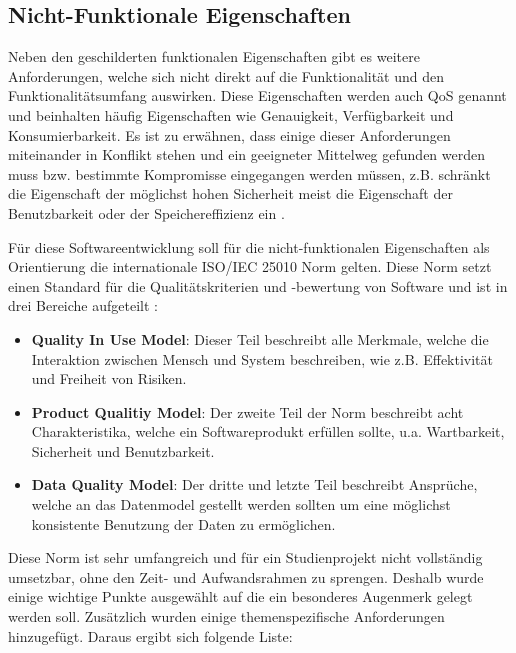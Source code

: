 \subsection{Nicht-Funktionale Eigenschaften}
Neben den geschilderten funktionalen Eigenschaften gibt es weitere Anforderungen, welche sich nicht direkt auf die Funktionalität und den Funktionalitätsumfang auswirken. Diese Eigenschaften werden auch \ac{QoS} genannt und beinhalten häufig Eigenschaften wie  Genauigkeit, Verfügbarkeit und  Konsumierbarkeit. Es ist zu erwähnen, dass einige dieser Anforderungen miteinander in Konflikt stehen und ein geeigneter Mittelweg gefunden werden muss bzw. bestimmte Kompromisse eingegangen werden müssen, z.B. schränkt die Eigenschaft der möglichst hohen Sicherheit meist die Eigenschaft der Benutzbarkeit oder der Speichereffizienz ein \cite{Balzert.2009}.  

\vspace{0.25cm}

Für diese Softwareentwicklung soll für die nicht-funktionalen Eigenschaften als Orientierung die internationale ISO/IEC 25010 Norm gelten. Diese Norm setzt einen Standard für die Qualitätskriterien und -bewertung von Software und ist in drei Bereiche aufgeteilt \cite{ISO.2011} \cite{Braun.2016}:

\begin{itemize}
	\item \textbf{Quality In Use Model}: Dieser Teil beschreibt alle Merkmale, welche die Interaktion zwischen Mensch und System beschreiben, wie z.B. Effektivität und Freiheit von Risiken.
	\item \textbf{Product Qualitiy Model}: Der zweite Teil der Norm beschreibt acht Charakteristika, welche ein Softwareprodukt erfüllen sollte, u.a. Wartbarkeit, Sicherheit und Benutzbarkeit.
	\item \textbf{Data Quality Model}: Der dritte und letzte Teil beschreibt Ansprüche, welche an das Datenmodel gestellt werden sollten um eine möglichst konsistente Benutzung der Daten zu ermöglichen.
\end{itemize}

Diese Norm ist sehr umfangreich und für ein Studienprojekt nicht vollständig umsetzbar, ohne den Zeit- und Aufwandsrahmen zu sprengen. Deshalb wurde einige wichtige Punkte ausgewählt auf die ein besonderes Augenmerk gelegt werden soll. Zusätzlich wurden einige themenspezifische Anforderungen hinzugefügt. Daraus ergibt sich folgende Liste:

